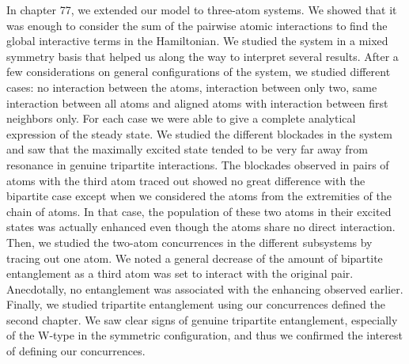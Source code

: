 In chapter 77, we extended our model to three-atom systems. We showed that it was enough to consider the sum of the pairwise atomic interactions to find the global interactive terms in the Hamiltonian. We studied the system in a mixed symmetry basis that helped us along the way to interpret several results. After a few considerations on  general configurations of the system, we studied different cases: no interaction between the atoms, interaction between only two, same interaction between all atoms and aligned atoms with interaction between first neighbors only. For each case we were able to give a complete analytical expression of the steady state. We studied the different blockades in the system and saw that the maximally excited state tended to be very far away from resonance in genuine tripartite interactions. The  blockades observed in pairs of atoms with the third atom traced out showed no great difference with the bipartite case except when we considered the atoms from the extremities of the chain of atoms. In that case, the population of these two atoms in their excited states was actually enhanced even though the atoms  share no direct interaction. Then, we studied the two-atom concurrences in the different subsystems by tracing out one atom. We noted a general decrease of the amount of bipartite entanglement as a third atom was set to interact with the original pair. Anecdotally, no entanglement was associated with the enhancing observed earlier. Finally, we studied  tripartite entanglement using our concurrences defined the second chapter. We saw clear signs of genuine tripartite entanglement, especially of the W-type in the symmetric configuration, and thus we confirmed the interest of defining our concurrences.

